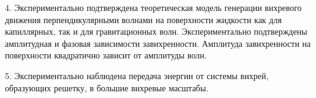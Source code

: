 4. Экспериментально подтверждена теоретическая модель генерации вихревого движения перпендикулярными волнами на поверхности жидкости как для капиллярных, так и для гравитационных волн. Экспериментально подтверждены амплитудная и фазовая зависимости завихренности. Амплитуда завихренности на поверхности квадратично зависит от амплитуды волн. 

5. Экспериментально наблюдена передача энергии от системы вихрей, образующих решетку, в большие вихревые масштабы.

%
%
